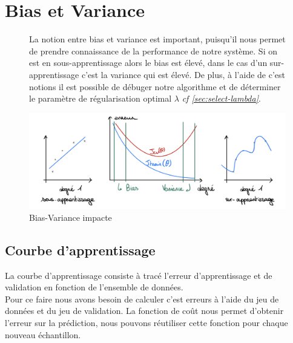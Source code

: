 \section{Bias et Variance}

\begin{figure}[!h]
    \begin{minipage}{.40\linewidth}
        La notion entre bias et variance est important, puisqu'il nous permet de prendre connaissance de la performance de notre système. Si on est en sous-apprentissage alors le bias est élevé, dans le cas d'un sur-apprentissage c'est la variance qui est élevé. De plus, à l'aide de c'est
        notions il est possible de débuger notre algorithme et de déterminer le paramètre de régularisation optimal $\lambda$ \textit{cf \ref{sec:select-lambda}}.
    \end{minipage}\hfill
    \begin{minipage}{.56\linewidth}
        \begin{center}
            \includegraphics[width=1\textwidth]{./img/4.jpeg}
            \caption{\label{fig:bias-variance}Bias-Variance impacte}  
        \end{center}
    \end{minipage}
\end{figure}

 



\subsection{Courbe d'apprentissage}

La courbe d'apprentissage consiste à tracé l'erreur d'apprentissage et de validation en fonction de l'ensemble de données. \\
Pour ce faire nous avons besoin de calculer c'est erreurs à l'aide du jeu de données et du jeu de validation. La fonction de coût nous permet d'obtenir l'erreur sur la prédiction, nous pouvons réutiliser cette fonction pour chaque nouveau échantillon.

